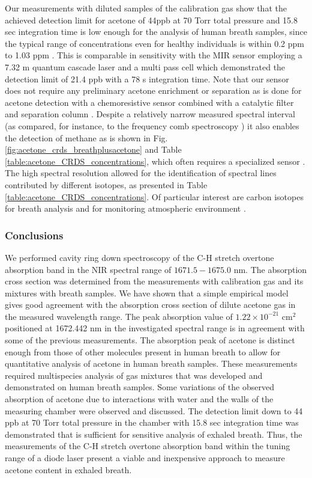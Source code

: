 \documentclass[8pt,a4paper]{report}
\begin{document}
	Our measurements with diluted samples of the calibration gas show that the achieved detection limit for acetone of 44ppb at 70 Torr total pressure and 15.8 sec integration time is low enough for the analysis of human breath samples, since the typical range of concentrations even for healthy individuals is within 0.2 ppm to 1.03 ppm \cite{Wang_2013}. This is comparable in sensitivity with the MIR sensor employing a 7.32 {\textmu}m quantum cascade laser and a multi pass cell \cite{Li_2023} which demonstrated the detection limit of 21.4 ppb with a 78 s integration time. Note that our sensor does not require any preliminary acetone enrichment or separation as is done for acetone detection with a chemoresistive sensor combined with a catalytic filter and separation column \cite{Bastide_2023}. Despite a relatively narrow measured spectral interval (as compared, for instance, to the frequency comb spectroscopy \cite{ours_review_2022}) it also enables the detection of methane as is shown in Fig. \ref{fig:acetone_crds_breathplusacetone} and Table \ref{table:acetone_CRDS_concentrations}, which often requires a specialized sensor \cite{Kwasny_2023}. The high spectral resolution allowed for the identification of spectral lines contributed by different isotopes, as presented in Table \ref{table:acetone_CRDS_concentrations}. Of particular interest are carbon isotopes for breath analysis \cite{Shao_2022} and for monitoring atmospheric environment \cite{Bakkaloglu_2022}.
	
	\subsubsection{Conclusions}
	We performed cavity ring down spectroscopy of the C-H stretch overtone absorption band in the NIR spectral range of $1671.5-1675.0$ nm. The absorption cross section was determined from the measurements with calibration gas and its mixtures with breath samples. We have shown that a simple empirical model gives good agreement with the absorption cross section of dilute acetone gas in the measured wavelength range. The peak absorption value of $1.22 \times 10^{-21}\text{ cm}^2$ positioned at 1672.442 nm in the investigated spectral range is in agreement with some of the previous measurements. The absorption peak of acetone is distinct enough from those of other molecules present in human breath to allow for quantitative analysis of acetone in human breath samples. These measurements required multispecies analysis of gas mixtures that was developed and demonstrated on human breath samples. Some variations of the observed absorption of acetone due to interactions with water and the walls of the measuring chamber were observed and discussed. The detection limit down to 44 ppb at 70 Torr total pressure in the chamber with 15.8 sec integration time was demonstrated that is sufficient for sensitive analysis of exhaled breath. Thus, the measurements of the C-H stretch overtone absorption band within the tuning range of a diode laser present a viable and inexpensive approach to measure acetone content in exhaled breath.
	
\end{document}
